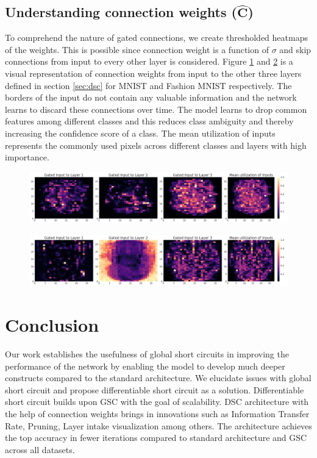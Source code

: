 \documentclass{article}
\let\oldhat\hat
\renewcommand{\hat}[1]{\oldhat{\mathbf{#1}}}
\begin{document}
\subsection{Understanding connection weights ($\hat{C}$)}
\label{subsec:understanding_connection_weights}
To comprehend the nature of gated connections, we create thresholded heatmaps of the weights. This is possible since connection weight is a function of $\sigma$ and skip connections from input to every other layer is considered. Figure \ref{fig:mnist_vis} and \ref{fig:fashion_mnist_vis} is a visual representation of connection weights from input to the other three layers defined in section \ref{sec:dsc} for MNIST and Fashion MNIST respectively. The borders of the input do not contain any valuable information and the network learns to discard these connections over time. The model learns to drop common features among different classes and this reduces class ambiguity and thereby increasing the confidence score of a class. The mean utilization of inputs represents the commonly used pixels across different classes and layers with high importance.

\begin{figure}[H]
\centering
\includegraphics[scale=0.2]{paper/mnist_vis.png}
\label{fig:mnist_vis}
\end{figure}

\begin{figure}[H]
\centering
\includegraphics[scale=0.2]{paper/fashionmnist_vis.png}
\label{fig:fashion_mnist_vis}
\end{figure}

\section{Conclusion}

Our work establishes the usefulness of global short circuits in improving the performance of the network by enabling the model to develop much deeper constructs compared to the standard architecture. We elucidate issues with global short circuit and propose differentiable short circuit as a solution. Differentiable short circuit builds upon GSC  with the goal of scalability. DSC architecture with the help of connection weights brings in innovations such as Information Transfer Rate, Pruning, Layer intake visualization among others. The architecture achieves the top accuracy in fewer iterations compared to standard architecture and GSC across all datasets. 
\end{document}
